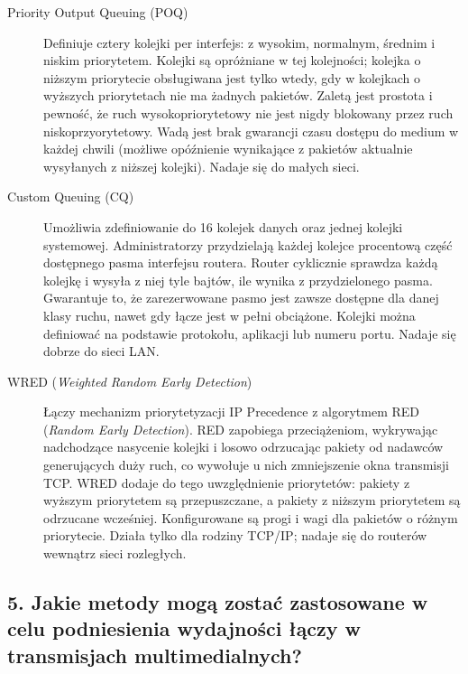 \documentclass[12pt,a4paper]{article}
\begin{document}
\begin{description}
  \item[Priority Output Queuing (POQ)]
        Definiuje cztery kolejki per interfejs: z wysokim, normalnym, średnim
        i niskim priorytetem. Kolejki są opróżniane w tej kolejności; kolejka
        o niższym priorytecie obsługiwana jest tylko wtedy, gdy w kolejkach
        o wyższych priorytetach nie ma żadnych pakietów. Zaletą jest prostota
        i pewność, że ruch wysokopriorytetowy nie jest nigdy blokowany przez
        ruch niskoprzyorytetowy. Wadą jest brak gwarancji czasu dostępu do
        medium w każdej chwili (możliwe opóźnienie wynikające z pakietów
        aktualnie wysyłanych z niższej kolejki). Nadaje się do małych sieci.

  \item[Custom Queuing (CQ)]
        Umożliwia zdefiniowanie do 16 kolejek danych oraz jednej kolejki
        systemowej. Administratorzy przydzielają każdej kolejce procentową
        część dostępnego pasma interfejsu routera. Router cyklicznie sprawdza
        każdą kolejkę i wysyła z niej tyle bajtów, ile wynika z przydzielonego
        pasma. Gwarantuje to, że zarezerwowane pasmo jest zawsze dostępne dla
        danej klasy ruchu, nawet gdy łącze jest w pełni obciążone. Kolejki
        można definiować na podstawie protokołu, aplikacji lub numeru portu.
        Nadaje się dobrze do sieci LAN.

  \item[WRED (\emph{Weighted Random Early Detection})]
        Łączy mechanizm priorytetyzacji IP Precedence z algorytmem RED
        (\emph{Random Early Detection}). RED zapobiega przeciążeniom, wykrywając
        nadchodzące nasycenie kolejki i losowo odrzucając pakiety od nadawców
        generujących duży ruch, co wywołuje u nich zmniejszenie okna transmisji
        TCP. WRED dodaje do tego uwzględnienie priorytetów: pakiety z wyższym
        priorytetem są przepuszczane, a pakiety z niższym priorytetem są
        odrzucane wcześniej. Konfigurowane są progi i wagi dla pakietów
        o różnym priorytecie. Działa tylko dla rodziny TCP/IP; nadaje się
        do routerów wewnątrz sieci rozległych.
\end{description}

\subsection*{5. Jakie metody mogą zostać zastosowane w celu podniesienia
wydajności łączy w transmisjach multimedialnych?}
\end{document}
